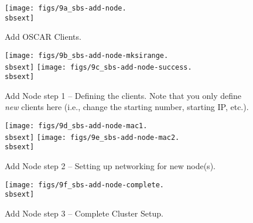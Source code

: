 \begin{figure}[h!]
  \begin{center}
    \centerline{\texttt{[image: figs/9a\_sbs-add-node.\\sbsext]}}
    \caption{Add OSCAR Clients.}
    \label{fig:sbs-add-node1}
  \end{center}
\end{figure}

\begin{figure}[h!]
  \begin{center}
    \centerline{
      \texttt{[image: figs/9b\_sbs-add-node-mksirange.\\sbsext]}
      \hspace{\imghskip}
      \texttt{[image: figs/9c\_sbs-add-node-success.\\sbsext]}
      }
    \caption[Add Node step 1 -- Defining the clients.]{Add Node step 1
      -- Defining the clients.  Note that you only define {\em new}
      clients here (i.e., change the starting number, starting IP,
      etc.).}
    \label{fig:sbs-add-node1-define-clients}
  \end{center}
\end{figure}

\begin{figure}[h!]
  \begin{center}
    \centerline{
      \texttt{[image: figs/9d\_sbs-add-node-mac1.\\sbsext]}
      \hspace{\imghskip}
      \texttt{[image: figs/9e\_sbs-add-node-mac2.\\sbsext]}
      }
    \caption{Add Node step 2 -- Setting up networking for new node(s).}
    \label{fig:sbs-add-node1-setup-network}
  \end{center}
\end{figure}

\begin{figure}[h!]
  \begin{center}
    \centerline{\texttt{[image: figs/9f\_sbs-add-node-complete.\\sbsext]}}
    \caption{Add Node step 3 -- Complete Cluster Setup.}
    \label{fig:sbs-add-node1-cluster-setup}
  \end{center}
\end{figure}

